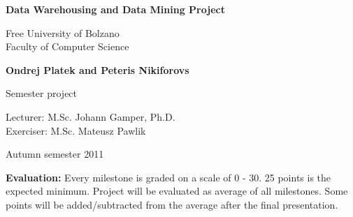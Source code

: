 \begin{titlepage}
\begin{center}

\vspace{15mm}
{\Large\bf Data Warehousing and Data Mining Project}
\vspace{10mm}

\large
Free University of Bolzano\\
Faculty of Computer Science\\
\vspace{15mm}

{\Large\bf Ondrej Platek and Peteris Nikiforovs}\\ 
\vspace{5mm}

{\Large Semester project}
\vspace{20mm}

Lecturer: M.Sc. Johann Gamper, Ph.D.\\
Exerciser: M.Sc. Mateusz Pawlik\\
\vspace{20mm}

Autumn semester 2011
\end{center}

\vspace{80mm}

\noindent 
{\bf Evaluation:}
Every milestone is graded on a scale of 0 - 30.
25 points is the expected minimum.
Project will be evaluated as average of all milestones.
Some points will be added/subtracted from the average after the final presentation.
\end{titlepage} %

\tableofcontents
